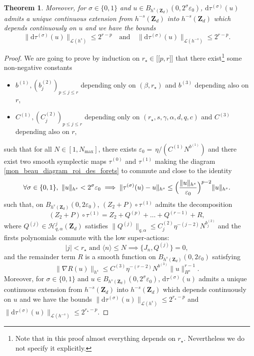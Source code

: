 \documentclass[11pt]{article}
\newcommand{\llbracket}{\mathopen{[\!\![}}
\newcommand{\rrbracket}{\mathclose{]\!\!]}}
\newtheorem{theorem}{Theorem}[section]
\theoremstyle{definition}
\begin{document}
\begin{theorem}
Moreover, for $\sigma\in \{0,1 \}$ and $u\in B_{h^s(\mathbf{Z}_d)}(0,2^{\sigma}\varepsilon_0)$, $\mathrm{d}\tau^{(\sigma)}(u)$ admits a unique continuous extension from $h^{-s}(\mathbf{Z}_d)$ into $h^{-s}(\mathbf{Z}_d)$ which depends continuously on $u$ and we have the bounds
\[
\|\mathrm{d} \tau^{(\sigma)}(u) \|_{\mathscr{L}(h^{s})} \leq 2^{r-p} \quad \text{and} \quad \|\mathrm{d} \tau^{(\sigma)}(u) \|_{\mathscr{L}(h^{-s})} \leq 2^{r-p}.
\]
\end{theorem}
\begin{proof} We are going to prove by induction on $r_{\star} \in \llbracket p,r \rrbracket$ that there exist\footnote{Note that in this proof almost everything depends on $r_\star$. Nevertheless we do not specify it explicitly.} some non-negative constants
\begin{itemize}
\item $b^{(1)},(b_j^{(2)})_{ p \leq j \leq r}$ depending only on $(\beta,r_\star)$ and $b^{(3)}$ depending also on $r$,
\item $C^{(1)},(C_{j}^{(2)})_{ p \leq j \leq r }$ depending only on $(r_\star,s,\gamma,\alpha,d,q,c)$ and $C^{(3)}$ depending also on $r$,
\end{itemize}
such that for all $N\in [1,N_{\max}]$, there exists $\varepsilon_0 = \, \eta /(C^{(1)} N^{b^{(1)}})$ and there exist two smooth symplectic maps $\tau^{(0)}$ and $\tau^{(1)}$
making the diagram \eqref{mon_beau_diagram_roi_des_forets} to commute and close to the identity
\begin{equation}
\label{eq_close_to_the_id_pres}
\forall \sigma\in \{0,1\}, \ \|u\|_{{h}^s} <2^{\sigma}\varepsilon_0 \implies
\|\tau^{(\sigma)}(u)-u\|_{h^s} \leq \Bigl(\frac{\|u\|_{h^s}}{\varepsilon_0} \Bigr)^{p-2} \|u\|_{h^s}.
\end{equation}
such that, on $ B_{h^s(\mathbf{Z}_d)}(0,2\varepsilon_0)$, $(Z_2+P) \circ \tau^{(1)}$ admits the decomposition
\[
(Z_2+P) \circ \tau^{(1)} = Z_2+ Q^{(p)} + \dots + Q^{(r-1)} + R,
\]
where $Q^{(j)} \in \mathscr{H}_{q,\alpha}^j(\mathbf{Z}_d)$ satisfies $ \| Q^{(j)} \|_{q,\alpha} \leq C_{j}^{(2)} \eta^{-(j-2)} N^{b_j^{(2)}}$ and the firsts polynomials commute with the low super-actions:
\[
|j| < r_{\star} \text{ and } \langle n \rangle\leq N \implies \{ J_n, Q^{(j)} \} = 0,
\]
and the remainder term $R$ is a smooth function on $B_{h^s(\mathbf{Z}_d)}(0,2\varepsilon_0)$ satisfying
\[
\|\nabla R(u)\|_{h^s} \leq C^{(3)} \eta^{-(r-2)} N^{b^{(3)}} \|u\|_{H^s}^{r-1}.
\]
Moreover, for $\sigma\in \{0,1 \}$ and $u\in B_{h^s(\mathbf{Z}_d)}(0,2^{\sigma}\varepsilon_0)$, $\mathrm{d}\tau^{(\sigma)}(u)$ admits a unique continuous extension from $h^{-s}(\mathbf{Z}_d)$ into $h^{-s}(\mathbf{Z}_d)$ which depends continuously on $u$ and we have the bounds
$\|\mathrm{d} \tau^{(\sigma)}(u) \|_{\mathscr{L}(h^{s})} \leq 2^{r_{\star}-p} $ and $\|\mathrm{d} \tau^{(\sigma)}(u) \|_{\mathscr{L}(h^{-s})} \leq 2^{r_{\star}-p}$.


\end{proof}
\end{document}
